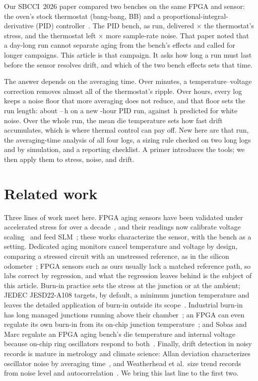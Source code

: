 \documentclass[10pt,twocolumn]{article}
\begin{document}
Our SBCCI~2026 paper compared two benches on the same FPGA and sensor: the oven's stock thermostat (bang-bang, BB) and a proportional-integral-derivative (PID) controller~\cite{sbcci26}. The PID bench, as run, delivered \vAFratio$\times$ the thermostat's stress, and the thermostat left \vSigRawRatio$\times$ more sample-rate noise. That paper noted that a day-long run cannot separate aging from the bench's effects and called for longer campaigns. This article is that campaign. It asks how long a run must last before the sensor resolves drift, and which of the two bench effects sets that time.

The answer depends on the averaging time. Over minutes, a temperature--voltage correction removes almost all of the thermostat's ripple. Over hours, every log keeps a noise floor that more averaging does not reduce, and that floor sets the run length: about \vDetFairLo--\vDetFairHi\,h on a new \vDurRCA-hour PID run, against \vTminBound\,h predicted for white noise. Over the whole run, the mean die temperature sets how fast drift accumulates, which is where thermal control can pay off. New here are that run, the averaging-time analysis of all four logs, a sizing rule checked on two long logs and by simulation, and a reporting checklist. A primer introduces the tools; we then apply them to stress, noise, and drift.

\section{Related work}

Three lines of work meet here. FPGA aging sensors have been validated under accelerated stress for over a decade~\cite{valdes}, and their readings now calibrate voltage scaling~\cite{niemann} and feed SLM~\cite{kashyap}; these works characterize the sensor, with the bench as a setting. Dedicated aging monitors cancel temperature and voltage by design, comparing a stressed circuit with an unstressed reference, as in the silicon odometer~\cite{keane}; FPGA sensors such as ours usually lack a matched reference path, so labs correct by regression, and what the regression leaves behind is the subject of this article. Burn-in practice sets the stress at the junction or at the ambient; JEDEC JESD22-A108 targets, by default, a minimum junction temperature and leaves the detailed application of burn-in outside its scope~\cite{jedec}. Industrial burn-in has long managed junctions running above their chamber~\cite{vassighi}; an FPGA can even regulate its own burn-in from its on-chip junction temperature~\cite{xilinx}; and Sobas and Marc regulate an FPGA aging bench's die temperature and internal voltage because on-chip ring oscillators respond to both~\cite{sobas}. Finally, drift detection in noisy records is mature in metrology and climate science: Allan deviation characterizes oscillator noise by averaging time~\cite{allan}, and Weatherhead et al.\ size trend records from noise level and autocorrelation~\cite{weatherhead}. We bring this last line to the first two.
\end{document}
